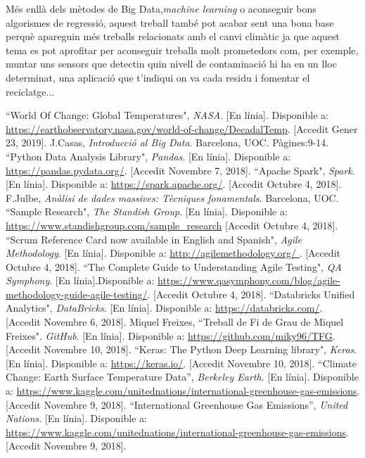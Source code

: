 \documentclass[10pt,a4paper,twocolumn,twoside]{article}
\begin{document}
Més enllà dels mètodes de Big Data,\textit{machine learning} o aconseguir bons algorismes de regressió, aquest treball també pot acabar sent una bona base perquè apareguin més treballs relacionats amb el canvi climàtic ja que aquest tema es pot aprofitar per aconseguir treballs molt prometedors com, per exemple, muntar uns sensors que detectin quin nivell de contaminació hi ha en un lloc determinat, una aplicació que t'indiqui on va cada residu i fomentar el reciclatge...

\begin{thebibliography}{11}
``World Of Change: Global Temperatures", \textit{NASA}. [En línia]. Disponible a: \url{https://earthobservatory.nasa.gov/world-of-change/DecadalTemp}. [Accedit Gener 23, 2019].
J.Casas, \textit{Introducció al Big Data}. Barcelona, UOC. Pàgines:9-14.
 ``Python Data Analysis Library", \textit{Pandas}. [En línia]. Disponible a: \url{https://pandas.pydata.org/}. [Accedit Novembre 7, 2018].
``Apache Spark", \textit{Spark}. [En línia]. Disponible a: \url{https://spark.apache.org/}. [Accedit Octubre 4, 2018].
F.Julbe, \textit{Anàlisi de dades massives: Tècniques fonamentals}. Barcelona, UOC.
``Sample Research", \textit{The Standish Group}. [En línia]. Disponible a: \url{https://www.standishgroup.com/sample_research} [Accedit Octubre 4, 2018].
``Scrum Reference Card now available in English and Spanish",  \textit{Agile Methodology}. [En línia]. Disponible a: \url{http://agilemethodology.org/ }. [Accedit Octubre 4, 2018].
``The Complete Guide to Understanding Agile Testing", \textit{QA Symphony}. [En línia].Disponible a: \url{https://www.qasymphony.com/blog/agile-methodology-guide-agile-testing/}. [Accedit Octubre 4, 2018].
``Databricks Unified Analytics", \textit{DataBricks}. [En línia]. Disponible a: \url{https://databricks.com/}. [Accedit Novembre 6, 2018].
Miquel Freixes, ``Treball de Fi de Grau de Miquel Freixes". \textit{GitHub}. [En línia]. Disponible a: \url{ https://github.com/miky96/TFG}. [Accedit Novembre 10, 2018].
``Keras: The Python Deep Learning library", \textit{Keras}. [En línia]. Disponible a: \url{https://keras.io/}. [Accedit Novembre 10, 2018].
``Climate Change: Earth Surface Temperature Data”, \textit{Berkeley Earth}. [En línia]. Disponible a: \url{ https://www.kaggle.com/unitednations/international-greenhouse-gas-emissions}. [Accedit Novembre 9, 2018].
 ``International Greenhouse Gas Emissions”, \textit{United Nations}. [En línia]. Disponible a: \url{ https://www.kaggle.com/unitednations/international-greenhouse-gas-emissions}. [Accedit Novembre 9, 2018].

\end{thebibliography}
\end{document}
